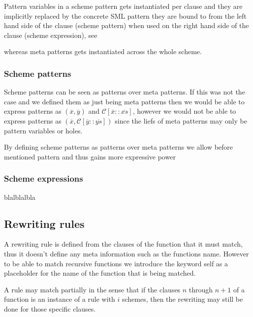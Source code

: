 Pattern variables in a scheme pattern gets instantiated per clause and they are
implicitly replaced by the concrete SML pattern they are bound to from the left
hand side of the clause (scheme pattern) when used on the right hand side of the
clause (scheme expression), see 

whereas meta patterns gets instantiated across the whole
scheme.


\subsubsection{Scheme patterns}
Scheme patterns can be seen as patterns over meta patterns. If this was not the
case and we defined them as just being meta patterns then we would be able to
express patterns as $(\overline{x}, \overline{y})$ and $\mathcal{C}[\overline{x}
:: \overline{xs}]$, however we would not be able to express patterns as
$(\overline{x}, \mathcal{C}[\overline{y} :: \overline{ys}])$ since the liefs of
meta patterns may only be pattern variables or holes.

By defining scheme patterns as patterns over meta patterns we allow before
mentioned pattern and thus gains more expressive power

\subsubsection{Scheme expressions}
blalblalbla

\subsection{Rewriting rules}


A rewriting rule is defined from the clauses of the function that it must match,
thus it doesn't define any meta information such as the functions name. However
to be able to match recursive functions we introduce the keyword \textsf{self}
as a placeholder for the name of the function that is being matched.


A rule may match partially in the sense that if the clauses $n$ through $n+1$ of
a function is an instance of a rule with $i$ schemes, then the rewriting may still be
done for those specific clauses.

